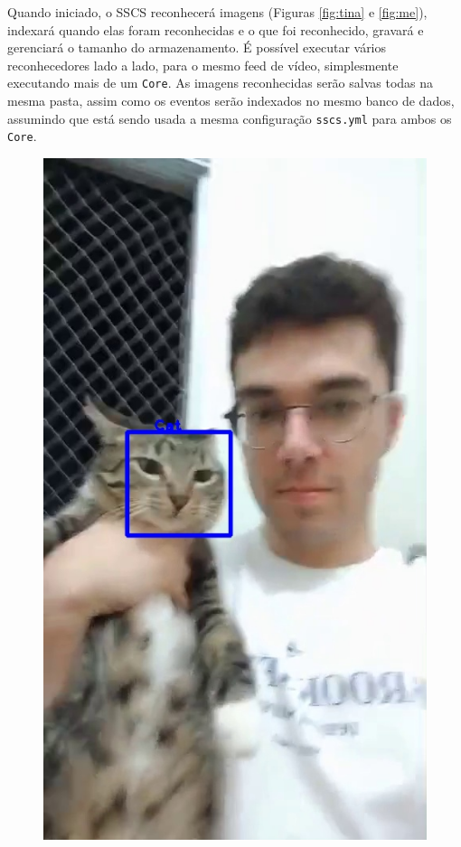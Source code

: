 \documentclass[12pt, %
openright, 
oneside, %
a4paper,    %
brazil]{facom-ufu-abntex2}
\begin{document}
\begin{apendicesenv}
	Quando iniciado, o SSCS reconhecerá imagens (Figuras \ref{fig:tina} e
	\ref{fig:me}), indexará quando elas foram reconhecidas e o que foi reconhecido,
	gravará e gerenciará o tamanho do armazenamento. É possível executar vários
	reconhecedores lado a lado, para o mesmo feed de vídeo, simplesmente executando
	mais de um \texttt{Core}. As imagens reconhecidas serão salvas todas na mesma
	pasta, assim como os eventos serão indexados no mesmo banco de dados, assumindo
	que está sendo usada a mesma configuração \texttt{sscs.yml} para ambos os
	\texttt{Core}.

	\begin{figure}[ht]
		\centering
		\begin{minipage}{0.48\textwidth}
			\centering
			\includegraphics[scale=0.35]{./figuras/rec1.jpeg}

\end{minipage}
\end{figure}
\end{apendicesenv}
\end{document}
